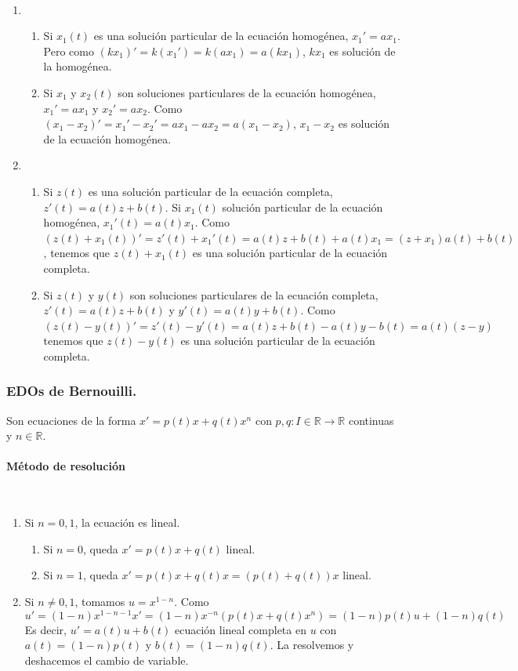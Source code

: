 \documentclass[11pt, a4paper,twoside]{article}
\makeatletter
\theoremstyle{theorem-style}  %
\renewenvironment{proof}[1][\proofname]{\par
	\pushQED{\qed}%
	\normalfont \topsep6\p@\@plus6\p@\relax
	\list{}{%
		\settowidth{\leftmargin}{\quad:\hskip\labelsep}%
		\setlength{\labelwidth}{0pt}%
		\setlength{\itemindent}{-\leftmargin}%
	}%
	\item[\hskip\labelsep\itshape#1\@addpunct{:}]\ignorespaces
}{%
	\popQED\endlist\@endpefalse
}
\theoremstyle{definition-style}
\theoremstyle{example-style}
\makeatother
\begin{document}
\begin{proof} \ 
	\begin{enumerate}
		\item \ 
		\begin{enumerate}[\quad a)]
			\item Si $ x_1(t) $ es una solución particular de la ecuación homogénea, $ x_1'=ax_1 $. Pero como $ (kx_1)'=k(x_1')=k(ax_1)=a(kx_1) $, $ kx_1 $ es solución de la homogénea.
			\item Si $ x_1 $ y $ x_2(t) $ son soluciones particulares de la ecuación homogénea,  $ x_1'=ax_1 $ y  $ x_2'=ax_2 $. Como $ (x_1-x_2)'=x_1'-x_2'=ax_1-ax_2=a(x_1-x_2) $, $ x_1-x_2 $ es solución de la ecuación homogénea.
		\end{enumerate}
		\item \ 
		\begin{enumerate}[\quad a)]
			\item Si $ z(t) $ es una solución particular de la ecuación completa, $ z'(t)=a(t)z+b(t) $. Si $ x_1(t) $ solución particular de la ecuación homogénea, $ x_1'(t)=a(t)x_1 $. Como $ (z(t)+x_1(t))'=z'(t)+x_1'(t)=a(t)z+b(t)+a(t)x_1 = (z+x_1)a(t)+b(t)$, tenemos que $ z(t)+x_1(t)$ es una solución particular de la ecuación completa.
			\item Si $ z(t) $ y $ y(t) $ son soluciones particulares de la ecuación completa, $ z'(t)=a(t)z+b(t) $ y $ y'(t)=a(t)y+b(t) $. Como $ (z(t)-y(t))'=z'(t)-y'(t)=a(t)z+b(t) - a(t)y-b(t)=a(t)(z-y) $ tenemos que $ z(t)-y(t) $ es una solución particular de la ecuación completa.
		\end{enumerate}
	\end{enumerate}
\end{proof}
\subsubsection{EDOs de Bernouilli.}
Son ecuaciones de la forma $ x'=p(t)x+q(t)x^n $ con $ p,q: I\in\mathbb{R}\longrightarrow \mathbb{R} $ continuas y $ n\in\mathbb{R} $.
\paragraph{Método de resolución} \ 
\begin{enumerate}
	\item Si $ n=0,1 $, la ecuación es lineal.
	\begin{enumerate}
		\item Si $ n=0 $, queda $ x'=p(t)x+q(t) $ lineal.
		\item Si $ n=1 $, queda $ x'=p(t)x+q(t)x=(p(t)+q(t))x $ lineal.
	\end{enumerate} 
	\item Si $ n\neq 0,1 $, tomamos $ u=x^{1-n} $. Como 
	\[ u'=(1-n)x^{1-n-1}x'=(1-n)x^{-n}(p(t)x+q(t)x^n)=(1-n)p(t)u+(1-n)q(t) \]
	Es decir, $ u'=a(t)u+b(t) $ ecuación lineal completa en $ u $ con $ a(t)=(1-n)p(t) $ y $ b(t)=(1-n)q(t) $. La resolvemos y deshacemos el cambio de variable.
\end{enumerate}
\end{document}
